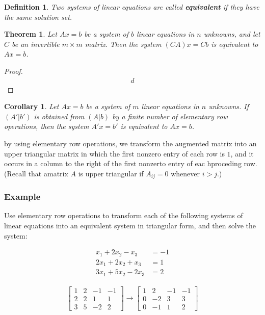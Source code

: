 \documentclass[10pt, oneside]{article}
\newtheorem{thm}{Theorem}
\newtheorem{defn}{Definition}
\newtheorem{cor}{Corollary}
\begin{document}
\begin{defn}
	Two systems of linear equations are called \textbf{equivalent} if they have the same solution set.
\end{defn}

\begin{thm}
	Let $Ax = b$ be a system of $b$ linear equations in $n$ unknowns, and let $C$ be an invertible $m \times m$ matrix. Then the system $(CA)x = Cb$ is equivalent to $Ax = b$.
\end{thm}

\begin{proof}
	\begin{align*}
		d
	\end{align*}
\end{proof}

\begin{cor}
	Let $Ax = b$ be a system of $m$ linear equations in $n$ unknowns. If $(A'|b')$ is obtained from $(A|b)$ by a finite number of elementary row operations, then the system $A'x = b'$ is equivalent to $Ax = b$.
\end{cor}

by using elementary row operations, we transform the augmented matrix into an upper triangular matrix in which the first nonzero entry of each row is $1$, and it occurs in a column to the right of the first
nonzerto entry of eac hproceding row. (Recall that amatrix $A$ is upper triangular if $A_{ij} = 0$ whenever $i > j$.)

\subsubsection{Example}
Use elementary row operations to transform each of the following systems of linear equations into an equivalent system in triangular form, and then solve the system:

\[
	\begin{array}{ll}
		x_1 + 2x_2 - x_3   & = -1 \\
		2x_1 + 2x_2 + x_3  & = 1  \\
		3x_1 + 5x_2 - 2x_3 & = 2
	\end{array}
\]

\[
	\begin{split}
		\begin{bmatrix} 1 & 2 & -1 & -1 \\ 2 & 2 & 1 & 1 \\ 3 & 5 & -2 & 2 \end{bmatrix} \rightarrow \begin{bmatrix} 1 & 2 & -1 & -1 \\ 0 & -2 & 3 & 3 \\ 0 & -1 & 1 & 2 \end{bmatrix} \\
	\end{split}
\]
\end{document}
